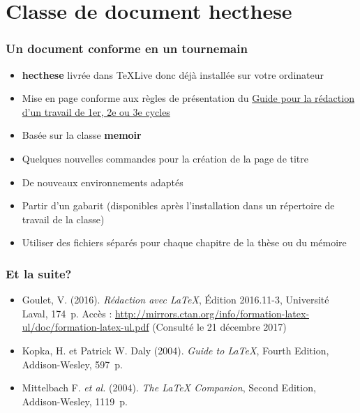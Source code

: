 \section{Classe de document hecthese}


\begin{frame}

	\frametitle{Un document conforme en un tournemain}
	
	\begin{itemize}
		\item \textbf{hecthese} livrée dans \TeX Live donc déjà installée sur votre ordinateur
		\item Mise en page conforme aux règles de présentation du
			\href{http://www.hec.ca/qualitecomm/caf/guide-redaction-travail-cycles.pdf}{%
				Guide pour la rédaction d'un travail de 1er, 2e ou 3e cycles}
		\item Basée sur la classe \textbf{memoir}
		\item Quelques nouvelles commandes pour la création de la page de titre
		\item De nouveaux environnements adaptés
		\item Partir d’un gabarit (disponibles après l'installation dans un répertoire de travail de 
			la classe)
		\item Utiliser des fichiers séparés pour chaque chapitre de la thèse ou	du mémoire
	\end{itemize}
\end{frame}


\begin{frame}[c]

	\frametitle{Et la suite?}
	
	\begin{itemize}
		\item Goulet, V. (2016). \textit{Rédaction avec {\LaTeX}}, Édition 2016.11-3, Université Laval, 174~p. Accès : \href{http://mirrors.ctan.org/info/formation-latex-ul/doc/formation-latex-ul.pdf}{%
		http://mirrors.ctan.org/info/formation-latex-ul/doc/formation-latex-ul.pdf} (Consulté le 21 décembre 2017)
		\item Kopka, H. et Patrick W. Daly (2004). \textit{Guide to {\LaTeX}}, Fourth Edition, Addison-Wesley, 597~p.
		\item Mittelbach F. \textit{et al.} (2004). \textit{The {\LaTeX} Companion}, Second Edition, Addison-Wesley, 1119~p.
	\end{itemize}
\end{frame}